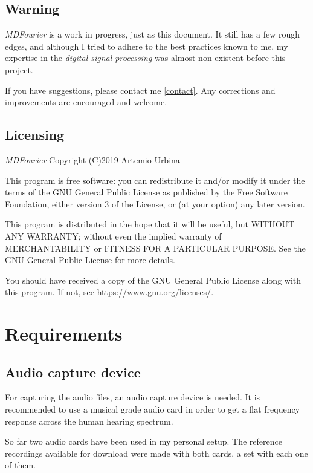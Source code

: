 \documentclass[10pt,a4paper]{report}
\begin{document}
\section{Warning}

\textit{MDFourier} is a work in progress, just as this document. It still has a few rough edges, and although I tried to adhere to the best practices known to me, my expertise in the \textit{digital signal processing} was almost non-existent before this project. 

If you have suggestions, please contact me \ref{contact}. Any corrections and improvements are encouraged and welcome.

\section{Licensing}

\textit{MDFourier} Copyright (C)2019 Artemio Urbina

This program is free software: you can redistribute it and/or modify
it under the terms of the GNU General Public License as published by
the Free Software Foundation, either version 3 of the License, or
(at your option) any later version.

This program is distributed in the hope that it will be useful,
but WITHOUT ANY WARRANTY; without even the implied warranty of
MERCHANTABILITY or FITNESS FOR A PARTICULAR PURPOSE.  See the
GNU General Public License for more details.

You should have received a copy of the GNU General Public License
along with this program.  If not, see \url{https://www.gnu.org/licenses/}.

\chapter{Requirements}

\section{Audio capture device}

For capturing the audio files, an audio capture device is needed. It is recommended to use a musical grade audio card in order to get a flat frequency response across the human hearing spectrum.

So far two audio cards have been used in my personal setup. The reference recordings available for download were made with both cards, a set with each one of them.
\end{document}
